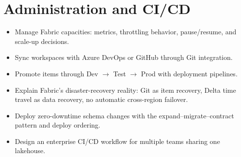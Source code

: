 \chapter{Administration and CI/CD}
%

\begin{objectives}
\begin{itemize}
    \item Manage Fabric capacities: metrics, throttling behavior, pause/resume, and scale-up decisions.
    \item Sync workspaces with Azure DevOps or GitHub through Git integration.
    \item Promote items through Dev $\rightarrow$ Test $\rightarrow$ Prod with deployment pipelines.
    \item Explain Fabric's disaster-recovery reality: Git as item recovery, Delta time travel as data recovery, no automatic cross-region failover.
    \item Deploy zero-downtime schema changes with the expand--migrate--contract pattern and deploy ordering.
    \item Design an enterprise CI/CD workflow for multiple teams sharing one lakehouse.
\end{itemize}
\end{objectives}

